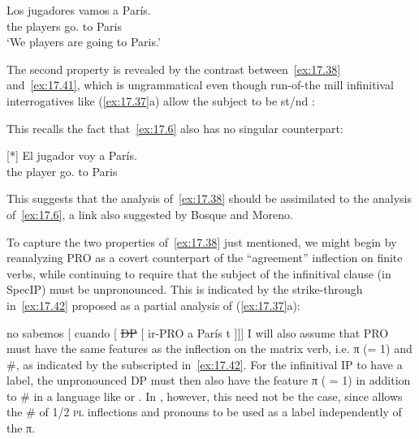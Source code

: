 \documentclass[output=paper]{langsci/langscibook}
\begin{document}
\begin{exe}
\exi{\eqref{ex:17.6}}
    \gll    Los jugadores vamos a París.\\
            the players      go.\Fpl{} to Paris\\
    \glt    ‘We players are going to Paris.’\\
\end{exe}
The second property is revealed by the contrast between~\eqref{ex:17.38}
and~\eqref{ex:17.41}, which is ungrammatical even though run-of-the mill
infinitival interrogatives like (\ref{ex:17.37}a) allow the subject to be
\First{}st/\Second{}nd \Sg:

\label{ex:17.41}
\z
This recalls the fact that~\eqref{ex:17.6} also has no singular counterpart:

\begin{exe}
\exi{\eqref{ex:17.19}}[*]{%
    \gll El jugador voy a París.\\
        the player go.\Fsg{} to Paris\\
    \glt}
\end{exe}
This suggests that the analysis of~\eqref{ex:17.38} should be assimilated to the
analysis of~\eqref{ex:17.6}, a link also suggested by Bosque and Moreno.

To capture the two properties of~\eqref{ex:17.38} just mentioned, we might
begin by reanalyzing PRO as a covert counterpart of the “agreement” inflection
on finite verbs, while continuing to require that the subject of the
infinitival clause (in SpecIP) must be unpronounced. This is indicated by the
strike-through in~\eqref{ex:17.42} proposed as a partial analysis of
(\ref{ex:17.37}a):

\ea\label{ex:17.42}
    no sabemos\tss{\Fpl} [ cuando [ \sout{DP} [ ir-PRO\tss{\Fpl} a París t ]]]
\z
I will also assume that PRO must have the same features as the
inflection on the matrix verb, i.e. π (= 1) and \#, as indicated by the
subscripted \Fpl{} in~\eqref{ex:17.42}. For the infinitival IP to have a
label, the unpronounced DP must then also have the feature π ( = 1) in addition
to \# in a language like  or . In ,
however, this need not be the case, since  allows the \# of 1/2
\textsc{pl} inflections and pronouns to be used as a label independently of the
π.
\end{document}
